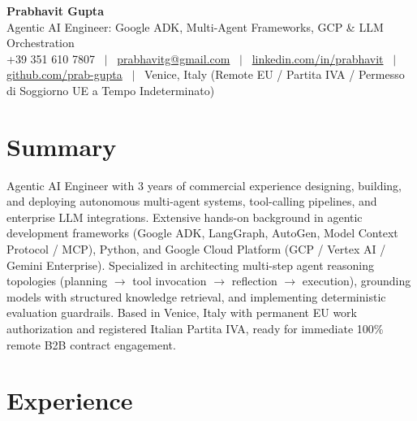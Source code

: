 \documentclass[a4paper,10pt]{article}
\begin{document}
\begin{minipage}[c]{0.80\textwidth}
  {\Huge\bfseries Prabhavit Gupta}\\[3pt]
  {\color{accent}\large Agentic AI Engineer: Google ADK, Multi-Agent Frameworks, GCP \& LLM Orchestration}\\[6pt]
  {\footnotesize +39 351 610 7807 ~$\vert$~
  \href{mailto:prabhavitg@gmail.com}{prabhavitg@gmail.com} ~$\vert$~
  \href{https://www.linkedin.com/in/prabhavit/}{linkedin.com/in/prabhavit} ~$\vert$~
  \href{https://github.com/prab-gupta}{github.com/prab-gupta} ~$\vert$~
  Venice, Italy (Remote EU / Partita IVA / Permesso di Soggiorno UE a Tempo Indeterminato)}
\end{minipage}\hfill

\section{Summary}
Agentic AI Engineer with 3 years of commercial experience designing, building, and deploying autonomous multi-agent systems, tool-calling pipelines, and enterprise LLM integrations. Extensive hands-on background in agentic development frameworks (Google ADK, LangGraph, AutoGen, Model Context Protocol / MCP), Python, and Google Cloud Platform (GCP / Vertex AI / Gemini Enterprise). Specialized in architecting multi-step agent reasoning topologies (planning $\rightarrow$ tool invocation $\rightarrow$ reflection $\rightarrow$ execution), grounding models with structured knowledge retrieval, and implementing deterministic evaluation guardrails. Based in Venice, Italy with permanent EU work authorization and registered Italian Partita IVA, ready for immediate 100\% remote B2B contract engagement.

\section{Experience}
\end{document}
